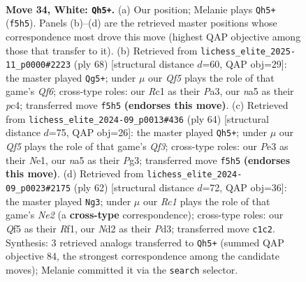 \documentclass[11pt]{article}
\begin{document}
\clearpage

\begin{figure}[p]\centering
\begin{subfigure}{0.46\textwidth}\centering
\resizebox{\linewidth}{!}{%
\newchessgame
\chessboard[
  setfen={r3k2r/p5pp/3b4/n2p1Q2/p2P2PP/4P2K/1q1N4/2R5 w - - 0 34},
  showmover=false,
  pgfstyle=straightmove, color=movearrow, markmove={f5-h5}
]}
\caption{}
\end{subfigure}\hfill
\begin{subfigure}{0.46\textwidth}\centering
\resizebox{\linewidth}{!}{%
\newchessgame
\chessboard[
  setfen={2b2rk1/p4p1p/5Q2/q1N1p3/2p5/P5P1/5P1P/6K1 w - - 4 35},
  showmover=false,
  pgfstyle=straightmove, color=movearrow, markmove={f6-g5}
]}
\caption{}
\end{subfigure}
\\[4pt]
\begin{subfigure}{0.46\textwidth}\centering
\resizebox{\linewidth}{!}{%
\newchessgame
\chessboard[
  setfen={r6k/pp3Bp1/3rnp2/5b2/5P2/5QP1/PP5P/4N1K1 w - - 7 33},
  showmover=false,
  pgfstyle=straightmove, color=movearrow, markmove={f3-h5}
]}
\caption{}
\end{subfigure}\hfill
\begin{subfigure}{0.46\textwidth}\centering
\resizebox{\linewidth}{!}{%
\newchessgame
\chessboard[
  setfen={Q7/p2bkr2/6pp/4pp2/P7/3PP3/2PqN1PP/5R1K w - - 2 32},
  showmover=false,
  pgfstyle=straightmove, color=movearrow, markmove={e2-g3}
]}
\caption{}
\end{subfigure}
\caption{\textbf{Move 34, White: \texttt{Qh5+}.} (a) Our position; Melanie plays \texttt{Qh5+} (\texttt{f5h5}). Panels (b)--(d) are the retrieved master positions whose correspondence most drove this move (highest QAP objective among those that transfer to it). (b) Retrieved from \texttt{lichess\_elite\_2025-11\_p0000\#2223} (ply 68) [structural distance $d$=60, QAP obj=29]: the master played \texttt{Qg5+}; under $\mu$ our \emph{Qf5} plays the role of that game's \emph{Qf6}; cross-type roles: our \emph{R}c1 as their \emph{P}a3, our \emph{n}a5 as their \emph{p}c4; transferred move \texttt{f5h5} \textbf{(endorses this move)}. (c) Retrieved from \texttt{lichess\_elite\_2024-09\_p0013\#436} (ply 64) [structural distance $d$=75, QAP obj=26]: the master played \texttt{Qh5+}; under $\mu$ our \emph{Qf5} plays the role of that game's \emph{Qf3}; cross-type roles: our \emph{P}e3 as their \emph{N}e1, our \emph{n}a5 as their \emph{P}g3; transferred move \texttt{f5h5} \textbf{(endorses this move)}. (d) Retrieved from \texttt{lichess\_elite\_2024-09\_p0023\#2175} (ply 62) [structural distance $d$=72, QAP obj=36]: the master played \texttt{Ng3}; under $\mu$ our \emph{Rc1} plays the role of that game's \emph{Ne2} (a \textbf{cross-type} correspondence); cross-type roles: our \emph{Q}f5 as their \emph{R}f1, our \emph{N}d2 as their \emph{P}d3; transferred move \texttt{c1c2}. Synthesis: 3 retrieved analogs transferred to \texttt{Qh5+} (summed QAP objective 84, the strongest correspondence among the candidate moves); Melanie committed it via the \texttt{search} selector.}
\label{fig:thought-m66}
\end{figure}
\end{document}
